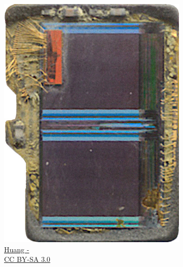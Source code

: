 \documentclass[ngerman]{schoolPres}
\begin{document}
\begin{frame}
\begin{columns}[c]
\begin{column}{.4\linewidth}
\begin{figure}[!ht]
          \begin{subfigure}{.3\linewidth}
            \includegraphics[width=\linewidth]{media/decapsulated-01.jpg}
            \caption{\tiny \href{https://commons.wikimedia.org/wiki/File:Decapsulated\_microSD\_memory\_card\_lineup-genuine,\_questionable,\_and\_fake-counterfeit.jpg}{Huang -\\CC BY-SA 3.0}}
          \end{subfigure}\hspace{4em}
          \begin{subfigure}{.3\linewidth}

\end{subfigure}
\end{figure}
\end{column}
\end{columns}
\end{frame}
\end{document}

